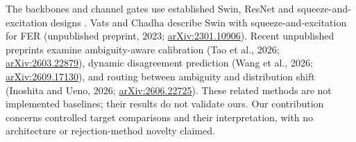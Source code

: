 The backbones and channel gates use established Swin, ResNet and squeeze-and-excitation designs \cite{liu2021swin,he2016resnet,hu2018senet}. Vats and Chadha describe Swin with squeeze-and-excitation for FER (unpublished preprint, 2023; \href{https://arxiv.org/abs/2301.10906}{arXiv:2301.10906}). Recent unpublished preprints examine ambiguity-aware calibration (Tao et al., 2026; \href{https://arxiv.org/abs/2603.22879}{arXiv:2603.22879}), dynamic disagreement prediction (Wang et al., 2026; \href{https://arxiv.org/abs/2609.17130}{arXiv:2609.17130}), and routing between ambiguity and distribution shift (Inoshita and Ueno, 2026; \href{https://arxiv.org/abs/2606.22725}{arXiv:2606.22725}). These related methods are not implemented baselines; their results do not validate ours. Our contribution concerns controlled target comparisons and their interpretation, with no architecture or rejection-method novelty claimed.
